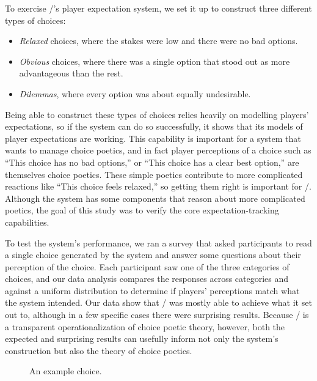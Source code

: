 To exercise \dunyazad/'s player expectation system, we set it up to construct three different types of choices:
%
\begin{itemize}
  \item \emph{Relaxed} choices, where the stakes were low and there were no bad options.
  \item \emph{Obvious} choices, where there was a single option that stood out as more advantageous than the rest.
  \item \emph{Dilemmas}, where every option was about equally undesirable.
\end{itemize}
%
Being able to construct these types of choices relies heavily on modelling players' expectations, so if the system can do so successfully, it shows that its models of player expectations are working.
%
This capability is important for a system that wants to manage choice poetics, and in fact player perceptions of a choice such as ``This choice has no bad options,'' or ``This choice has a clear best option,'' are themselves choice poetics.
%
These simple poetics contribute to more complicated reactions like ``This choice feels relaxed,'' so getting them right is important for \dunyazad/.
%
Although the system has some components that reason about more complicated poetics, the goal of this study was to verify the core expectation-tracking capabilities.


To test the system's performance, we ran a survey that asked participants to read a single choice generated by the system and answer some questions about their perception of the choice.
%
Each participant saw one of the three categories of choices, and our data analysis compares the responses across categories and against a uniform distribution to determine if players' perceptions match what the system intended.
%
Our data show that \dunyazad/ was mostly able to achieve what it set out to, although in a few specific cases there were surprising results.
%
Because \dunyazad/ is a transparent operationalization of choice poetic theory, however, both the expected and surprising results can usefully inform not only the system's construction but also the theory of choice poetics.

\begin{figure}[h]
  \caption{An example choice.}
  \label{fig:exchoice}
\end{figure}


